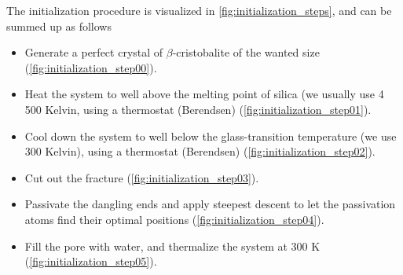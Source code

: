 The initialization procedure is visualized in \cref{fig:initialization_steps}, and can be summed up as follows
\begin{itemize}
    \item Generate a perfect crystal of $\beta$-cristobalite of the wanted size (\cref{fig:initialization_step00}).
    \item Heat the system to well above the melting point of silica (we usually use 4 500 Kelvin, using a thermostat (Berendsen) (\cref{fig:initialization_step01}).
    \item Cool down the system to well below the glass-transition temperature (we use 300 Kelvin), using a thermostat (Berendsen) (\cref{fig:initialization_step02}).
    \item Cut out the fracture (\cref{fig:initialization_step03}).
    \item Passivate the dangling ends and apply steepest descent to let the passivation atoms find their optimal positions (\cref{fig:initialization_step04}).
    \item Fill the pore with water, and thermalize the system at 300 K (\cref{fig:initialization_step05}).
\end{itemize}
%
